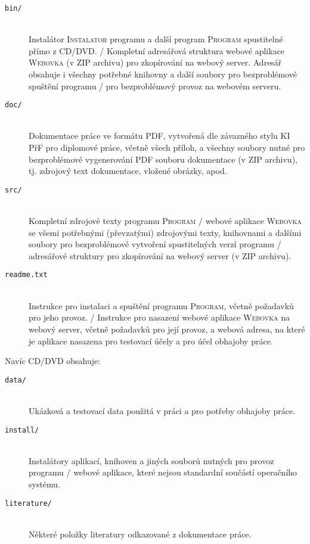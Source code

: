 \documentclass[12pt]{article}
\begin{document}
\begin{description}

\item[\texttt{bin/}] \hfill \\
Instalátor \textsc{Instalator} programu a další program
\textsc{Program} spustitelné přímo z CD/DVD. / Kompletní adresářová
struktura webové aplikace \textsc{Webovka} (v ZIP archivu) pro
zkopírování na webový server. Adresář obsahuje i všechny potřebné
knihovny a další soubory pro bezproblémové spuštění programu / pro
bezproblémový provoz na webovém serveru.

\item[\texttt{doc/}] \hfill \\
Dokumentace práce ve formátu PDF, vytvořená dle závazného stylu KI PřF
pro diplomové práce, včetně všech příloh, a všechny soubory nutné pro
bezproblémové vygenerování PDF souboru dokumentace (v ZIP archivu),
tj. zdrojový text dokumentace, vložené obrázky, apod.

\item[\texttt{src/}] \hfill \\
Kompletní zdrojové texty programu \textsc{Program} / webové aplikace
\textsc{Webovka} se všemi potřebnými (převzatými) zdrojovými texty,
knihovnami a dalšími soubory pro bezproblémové vytvoření spustitelných
verzí programu / adresářové struktury pro zkopírování na webový server
(v ZIP archivu).

\item[\texttt{readme.txt}] \hfill \\
Instrukce pro instalaci a spuštění programu \textsc{Program}, včetně
požadavků pro jeho provoz. / Instrukce pro nasazení webové aplikace
\textsc{Webovka} na webový server, včetně požadavků pro její provoz, a
webová adresa, na které je aplikace nasazena pro testovací účely a pro
účel obhajoby práce.

\end{description}

Navíc CD/DVD obsahuje:

\begin{description}

\item[\texttt{data/}] \hfill \\
Ukázková a testovací data použitá v práci a pro potřeby obhajoby
práce.

\item[\texttt{install/}] \hfill \\
Instalátory aplikací, knihoven a jiných souborů nutných pro provoz
programu / webové aplikace, které nejsou standardní součástí operačního
systému.

\item[\texttt{literature/}] \hfill \\
Některé položky literatury odkazované z dokumentace práce.

\end{description}
\end{document}
